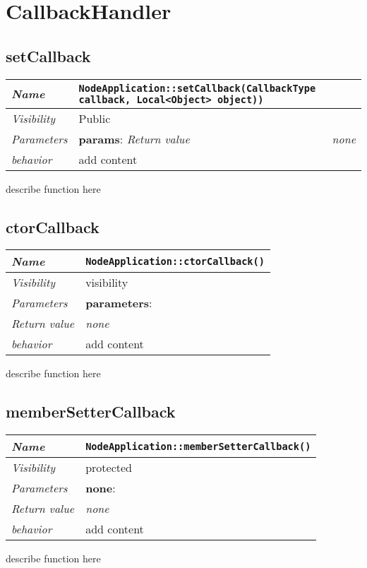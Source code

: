 \chapter{CallbackHandler}

\section{setCallback}
\begin{longtable}{p{3cm} @{\hskip 1cm} p{12cm}}
  \hline
  \textit{Name} & \texttt{NodeApplication::setCallback(CallbackType callback, Local<Object> object))} \\
  \hline
  \textit{Visibility} & Public \\
  \hline
  \textit{Parameters} & \textbf{params}: 
  \hline
  \textit{Return value} & \textit{none} \\
  \hline
  \textit{behavior} & add content \\
  \hline
\end{longtable}
describe function here
\newpage

\section{ctorCallback}
\begin{longtable}{p{3cm} @{\hskip 1cm} p{12cm}}
  \hline
  \textit{Name} & \texttt{NodeApplication::ctorCallback()} \\
  \hline
  \textit{Visibility} & visibility \\
  \hline
  \textit{Parameters} & \textbf{parameters}: \\
  \hline
  \textit{Return value} & \textit{none} \\
  \hline
  \textit{behavior} & add content \\
  \hline
\end{longtable}
describe function here
\newpage

\section{memberSetterCallback}
\begin{longtable}{p{3cm} @{\hskip 1cm} p{12cm}}
  \hline
  \textit{Name} & \texttt{NodeApplication::memberSetterCallback()} \\
  \hline
  \textit{Visibility} & protected \\
  \hline
  \textit{Parameters} & \textbf{none}: \\
  \hline
  \textit{Return value} & \textit{none} \\
  \hline
  \textit{behavior} & add content \\
  \hline
\end{longtable}
describe function here
\newpage

